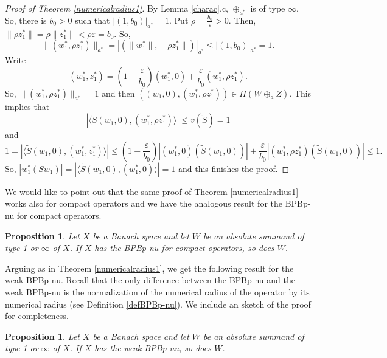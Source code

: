 \documentclass[10pt,a4paper]{amsart}
\theoremstyle{plain}
\newtheorem{prop}[theorem]{Proposition}
\theoremstyle{definition}
\newcommand{\eps}{\varepsilon}
\renewcommand{\leq}{\leqslant}
\begin{document}
\begin{proof}[Proof of Theorem \ref{numericalradius1}]
By Lemma \ref{charac}.c, $\oplus_{a^*}$ is of type $\infty$. So, there is $b_0 > 0$ such that $|(1, b_0)|_{a^*} = 1$. Put $\rho = \frac{b_0}{\eps} > 0$. Then, $\|\rho z_1^*\| = \rho \|z_1^*\| < \rho \eps = b_0$. So,
\begin{equation*}
\|(w_1^*, \rho z_1^*)\|_{a^*} = |(\|w_1^*\|, \|\rho z_1^*\|)|_{a^*} \leq |(1, b_0)|_{a^*} = 1.
\end{equation*}
Write
\begin{equation*}
(w_1^*, z_1^*) = \left( 1 - \frac{\eps}{b_0} \right) (w_1^*, 0) + \frac{\eps}{b_0} (w_1^*, \rho z_1^*).
\end{equation*}
So, $\|(w_1^*, \rho z_1^*)\|_{a^*} = 1$ and then $((w_1, 0), (w_1^*, \rho z_1^*)) \in \Pi(W \oplus_a Z)$. This implies that
\begin{equation*}
| \langle \widetilde{S} (w_1, 0), (w_1^*, \rho z_1^*) \rangle| \leq v(\widetilde{S}) = 1
\end{equation*}
and
\begin{equation*}
1 = | \langle \widetilde{S}(w_1, 0), (w_1^*, z_1^*) \rangle|
\leq \left(1 - \frac{\eps}{b_0} \right) |(w_1^*, 0)(\widetilde{S}(w_1, 0))| + \frac{\eps}{b_0} |(w_1^*, \rho z_1^*)(\widetilde{S}(w_1, 0))| \leq 1.	
\end{equation*}
So, $|w_1^*(Sw_1)| = | \langle \widetilde{S}(w_1, 0), (w_1^*, 0) \rangle| = 1$ and this finishes the proof.
\end{proof}

We would like to point out that the same proof of Theorem \ref{numericalradius1} works also for compact operators and we have the analogous result for the BPBp-nu for compact operators.

\begin{prop} \label{numericalradius2} Let $X$ be a Banach space and let $W$ be an absolute summand of type 1 or $\infty$ of $X$. If $X$ has the BPBp-nu for compact operators, so does $W$.		
\end{prop}

Arguing as in Theorem \ref{numericalradius1}, we get the following result for the weak BPBp-nu. Recall that the only difference between the BPBp-nu and the weak BPBp-nu is the normalization of the numerical radius of the operator by its numerical radius (see Definition \ref{defBPBp-nu}). We include an sketch of the proof for completeness.

\begin{prop} \label{weaknumericalradius1} Let $X$ be a Banach space and let $W$ be an absolute summand of type 1 or $\infty$ of $X$. If $X$ has the weak BPBp-nu, so does $W$.	
\end{prop}
\end{document}
